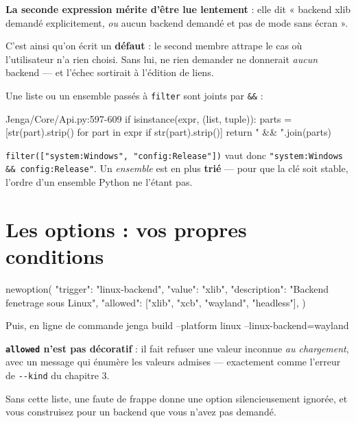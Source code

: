 \begin{nkretenir}
\textbf{La seconde expression mérite d'être lue lentement} : elle dit « backend
xlib demandé explicitement, \emph{ou} aucun backend demandé et pas de mode sans
écran ».

C'est ainsi qu'on écrit un \textbf{défaut} : le second membre attrape le cas où
l'utilisateur n'a rien choisi. Sans lui, ne rien demander ne donnerait
\emph{aucun} backend --- et l'échec sortirait à l'édition de liens.
\end{nkretenir}

\begin{nkretenir}
Une liste ou un ensemble passés à \texttt{filter} sont joints par \texttt{\&\&} :

\begin{nkcode}{Jenga/Core/Api.py:597-609}
if isinstance(expr, (list, tuple)):
    parts = [str(part).strip() for part in expr if str(part).strip()]
    return " && ".join(parts)
\end{nkcode}

\texttt{filter(["system:Windows", "config:Release"])} vaut donc
\texttt{"system:Windows \&\& config:Release"}. \alerte{} Un \emph{ensemble} est en plus
\textbf{trié} --- pour que la clé soit stable, l'ordre d'un ensemble Python ne
l'étant pas.
\end{nkretenir}

\section{Les options : vos propres conditions}

\begin{nkcode}{}
newoption({
    "trigger": "linux-backend",
    "value": "xlib",
    "description": "Backend fenetrage sous Linux",
    "allowed": ["xlib", "xcb", "wayland", "headless"],
})
\end{nkcode}

\begin{nkcode}{Puis, en ligne de commande}
jenga build --platform linux --linux-backend=wayland
\end{nkcode}

\begin{nkretenir}
\textbf{\texttt{allowed} n'est pas décoratif} : il fait refuser une valeur
inconnue \emph{au chargement}, avec un message qui énumère les valeurs admises
--- exactement comme l'erreur de \texttt{-{}-kind} du chapitre 3.

Sans cette liste, une faute de frappe donne une option silencieusement ignorée,
et vous construisez pour un backend que vous n'avez pas demandé.
\end{nkretenir}

